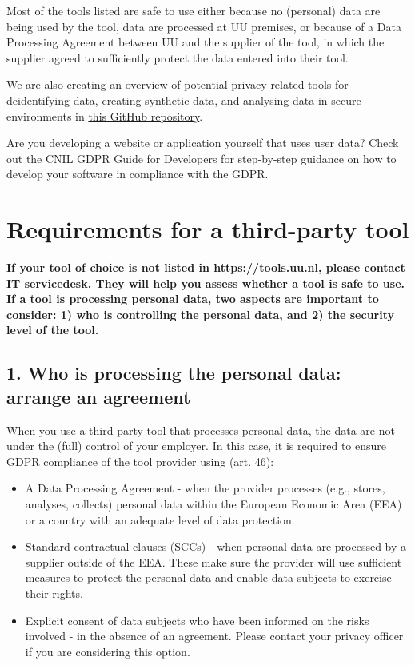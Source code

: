 \documentclass[
]{book}
\providecommand{\tightlist}{%
  \setlength{\itemsep}{0pt}\setlength{\parskip}{0pt}}
\begin{document}
Most of the tools listed are safe to use either because no (personal)
data are being used by the tool, data are processed at UU premises, or because
of a Data Processing Agreement between
UU and the supplier of the tool, in which the supplier agreed to
sufficiently protect the data entered into their tool.

We are also creating an overview of potential privacy-related tools for
deidentifying data, creating synthetic data, and analysing data in secure
environments in
\href{https://github.com/UtrechtUniversity/privacy-engineering-tools/}{this GitHub repository}.

Are you developing a website or application yourself that uses user data? Check
out the CNIL GDPR Guide for Developers
for step-by-step guidance on how to develop your software in compliance with the GDPR.

\hypertarget{tool-requirements}{%
\section{Requirements for a third-party tool}\label{tool-requirements}}

\textbf{If your tool of choice is not listed in \url{https://tools.uu.nl}, please contact
IT servicedesk. They will help you assess
whether a tool is safe to use. If a tool is processing personal data, two aspects
are important to consider: 1) who is controlling the personal data, and 2) the
security level of the tool.}

\hypertarget{who-is-processing-the-personal-data-arrange-an-agreement}{%
\subsection{1. Who is processing the personal data: arrange an agreement}\label{who-is-processing-the-personal-data-arrange-an-agreement}}

When you use a third-party tool that processes personal data, the data are not
under the (full) control of your employer. In this case, it is required to
ensure GDPR compliance of the tool provider using
(art. 46):

\begin{itemize}
\tightlist
\item
  A Data Processing Agreement -
  when the provider processes (e.g., stores, analyses, collects) personal data
  within the European Economic Area (EEA) or a country with an
  adequate level of data protection.
\item
  Standard
  contractual clauses (SCCs) - when personal data are processed by a
  supplier outside of the EEA. These make sure the provider will use
  sufficient measures to protect the personal data and enable data subjects to
  exercise their rights.
\item
  Explicit consent of data subjects who have been informed on the risks
  involved - in the absence of an agreement. Please contact your
  privacy officer
  if you are considering this option.
\end{itemize}
\end{document}
